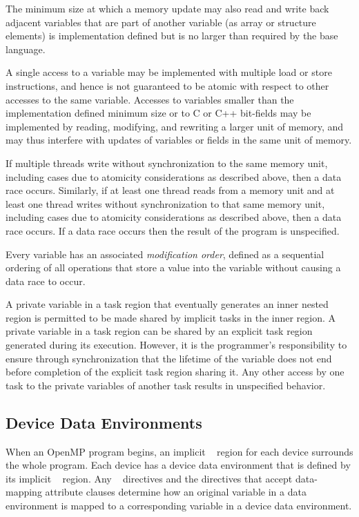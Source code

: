 The minimum size at which a memory update may also read and write back adjacent 
variables that are part of another variable (as array or structure elements) is
implementation defined but is no larger than required by the base language. 

A single access to a variable may be implemented with multiple load or store
instructions, and hence is not guaranteed to be atomic with respect to other accesses to
the same variable. Accesses to variables smaller than the implementation defined
minimum size or to C or C++ bit-fields may be implemented by reading, modifying, and 
rewriting a larger unit of memory, and may thus interfere with updates of variables or
fields in the same unit of memory.

If multiple threads write without synchronization to the same memory unit, including
cases due to atomicity considerations as described above, then a data race occurs.
Similarly, if at least one thread reads from a memory unit and at least one thread writes
without synchronization to that same memory unit, including cases due to atomicity
considerations as described above, then a data race occurs. If a data race occurs then the
result of the program is unspecified.

Every variable has an associated \emph{modification order}, defined as a
sequential ordering of all operations that store a value into the variable
without causing a data race to occur. 

A private variable in a task region that eventually generates an inner nested 
region is permitted to be made shared by implicit tasks in the inner  region.
A private variable in a task region can be shared by an explicit task region generated
during its execution. However, it is the programmer's responsibility to ensure through
synchronization that the lifetime of the variable does not end before completion of the
explicit task region sharing it. Any other access by one task to the
private variables of another task results in unspecified behavior.




\subsection{Device Data Environments}
\label{subsec:Device Data Environments}
When an OpenMP program begins, an implicit ~ region for each device surrounds the whole program. Each device has a device data environment that is defined by its implicit ~ region. Any ~ directives and the directives that accept data-mapping attribute clauses determine how an original variable in a data environment is mapped to a corresponding variable in a device data environment.

